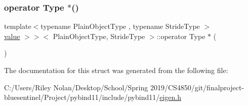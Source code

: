 \mbox{\label{structtype__caster_3_01_eigen_1_1_ref_3_01_plain_object_type_00_010_00_01_stride_type_01_4_00_014483c445e66b0d8d9bb7fc2aa837ecac_aa94cbaee52ae9c97fd8186a7c644bb85}} 
\subsubsection{\texorpdfstring{operator Type $\ast$()}{operator Type *()}}
{\footnotesize\ttfamily template$<$typename Plain\+Object\+Type , typename Stride\+Type $>$ \\
\mbox{\hyperlink{_s_d_l__opengl__glext_8h_a8ad81492d410ff2ac11f754f4042150f}{value}} $>$$>$$<$ Plain\+Object\+Type, Stride\+Type $>$\+::operator Type $\ast$ (\begin{DoxyParamCaption}{ }\end{DoxyParamCaption})\hspace{0.3cm}{\ttfamily [inline]}}



The documentation for this struct was generated from the following file\+:\begin{DoxyCompactItemize}
\item 
C\+:/\+Users/\+Riley Nolan/\+Desktop/\+School/\+Spring 2019/\+C\+S4850/git/finalproject-\/bluesentinel/\+Project/pybind11/include/pybind11/\mbox{\hyperlink{eigen_8h}{eigen.\+h}}\end{DoxyCompactItemize}
